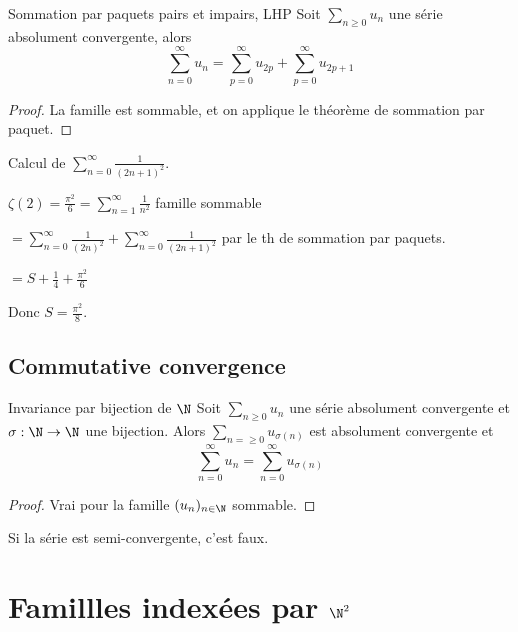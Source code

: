 \begin{proposition}{Sommation par paquets pairs et impairs, LHP}{}
    Soit $\sum_{n \geqslant 0} u_n$ une série absolument convergente, alors 
    $$\sum_{n  = 0 }^\infty u_n = \sum_{p = 0 }^\infty u_{2p} + \sum_{p = 0}^\infty u_{2p + 1}$$
\end{proposition}

\begin{proof}
    La famille est sommable, et on applique le théorème de sommation par paquet. 
\end{proof}

\begin{exemple}
    Calcul de $\displaystyle \sum_{n = 0 }^{\infty } \frac 1 {(2n + 1)^2}$. 

    $\displaystyle \zeta(2) = \frac{\pi^2} 6 = \sum_{n = 1}^\infty \frac 1 {n^2}$ famille sommable 

    $\displaystyle = \sum_{n = 0 }^{\infty } \frac 1 {(2n)^2} + \sum_{n = 0 }^{\infty } \frac 1 {(2n + 1)^2}$ par le th de sommation par paquets. 

    $\displaystyle = S + \frac 1 4 + \frac{\pi^2} 6$

    Donc $S = \frac {\pi^2} 8$.
\end{exemple}

\subsection{Commutative convergence }

\begin{theoreme}{Invariance par bijection de $\N$}{}
    Soit $\displaystyle \sum_{n \geqslant 0} u_n$ une série absolument convergente et $\sigma : \N \to \N$ une bijection.
    Alors $\displaystyle \sum_{n =\geqslant 0} u_{\sigma(n)}$ est absolument convergente et
    $$\sum_{n = 0}^\infty u_n = \sum_{n = 0}^\infty u_{\sigma(n)}$$
\end{theoreme}

\begin{proof}
    Vrai pour la famille $(u_n)_{n \in \N}$ sommable. 
\end{proof}

\begin{remarque}
    Si la série est semi-convergente, c'est faux.
\end{remarque}


\section{Famillles indexées par \texorpdfstring{$\N^2$}{N²}}
